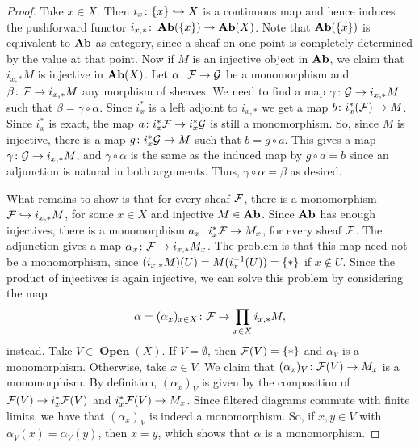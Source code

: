 \documentclass{article}
\DeclareMathOperator{\Open}{\mathbf{Open}}
\begin{document}
\begin{proof}
    Take $x\in X$. Then $i_{x}\colon \{x\} \hookrightarrow X$ is
    a continuous map and hence induces
    the pushforward functor $i_{x,*} \colon \operatorname{\mathbf{Ab}}(\{x\}) \to \operatorname{\mathbf{Ab}}(X)$.
    Note that $\operatorname{\mathbf{Ab}}(\{x\})$ is equivalent to $\operatorname{\mathbf{Ab}}$ as category,
    since a sheaf on one point is completely determined
    by the value at that point.
    Now if $M$ is an injective object in $\operatorname{\mathbf{Ab}}$, we claim that $i_{x,*}M$ is injective
    in $\operatorname{\mathbf{Ab}}(X)$. Let $\alpha \colon \mathcal{F} \to \mathcal{G}$ be a monomorphism and
    $\beta\colon \mathcal{F} \to i_{x, *}M$ any morphism of sheaves. We need to
    find a map $\gamma \colon \mathcal{G} \to i_{x, *}M$ such that $\beta = \gamma\circ \alpha$.
    Since $i_x^*$ is a left adjoint to $i_{x, *}$ we get a map
    $b \colon i_x^*(\mathcal{F}) \to M$. Since $i_x^*$ is exact, the map
    $a \colon i_x^*\mathcal{F} \to i_x^*\mathcal{G}$ is still a monomorphism. So,
    since $M$ is injective, there is a map $g\colon i_x^*\mathcal{G} \to M$
    such that $b = g\circ a$. This gives a map $\gamma \colon \mathcal{G} \to i_{x, *}M$,
    and $\gamma \circ \alpha$ is the same as the induced map by $g\circ a = b$
    since an adjunction is natural in both arguments.
    Thus, $\gamma \circ \alpha = \beta$ as desired.

    What remains to show is that for every sheaf $\mathcal{F}$, there is a monomorphism
    $\mathcal{F} \hookrightarrow i_{x, *}M$, for some $x\in X$ and injective $M\in \operatorname{\mathbf{Ab}}$.
    Since $\operatorname{\mathbf{Ab}}$ has enough injectives, there is a monomorphism $a_x\colon i_x^*\mathcal{F} \to M_x$,
    for every sheaf $\mathcal{F}$. The adjunction gives a map $\alpha_x\colon \mathcal{F} \to i_{x,*}M_x$.
    The problem is that this map need not be a monomorphism,
    since $(i_{x, *}M)(U) = M(i_x^{-1}(U)) = \{*\}$ if $x\notin U$.
    Since the product of injectives is again injective, we can solve this
    problem by considering the map
    \begin{equation*}
        \alpha = (\alpha_x)_{x\in X} \colon \mathcal{F} \to \prod\limits_{x\in X}i_{x,*}M,
    \end{equation*}
    instead. Take $V \in \Open(X)$. If $V = \emptyset$, then $\mathcal{F}(V) = \{*\}$
    and $\alpha_V$ is a monomorphism. Otherwise, take $x\in V$. We claim
    that $(\alpha_x)_V \colon \mathcal{F}(V) \to M_x$ is a monomorphism. By definition,
    $(\alpha_x)_V$ is given by the composition of $\mathcal{F}(V) \to i_x^*\mathcal{F}(V)$
    and $i_x^*\mathcal{F}(V) \to M_x$. Since filtered diagrams commute with
    finite limits, we have that $(\alpha_x)_V$ is indeed a monomorphism.
    So, if $x,y\in V$ with $\alpha_V(x) = \alpha_V(y)$, then $x=y$,
    which shows that $\alpha$ is a monomorphism.
\end{proof}
\end{document}
